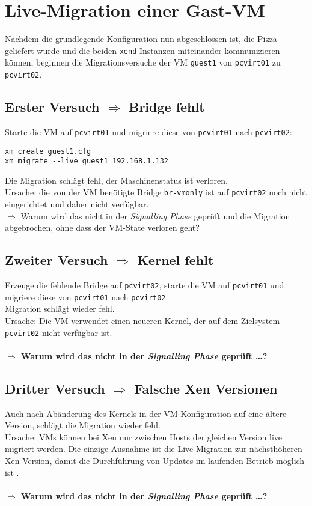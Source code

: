\section{Live-Migration einer Gast-VM}
\label{mig_vers}
Nachdem die grundlegende Konfiguration nun abgeschlossen ist, die Pizza geliefert wurde und die beiden \verb#xend# Instanzen miteinander kommunizieren können, beginnen die Migrationsversuche der VM \verb#guest1# von \verb#pcvirt01# zu \verb#pcvirt02#.

\subsection{Erster Versuch $\Rightarrow$ Bridge fehlt}
Starte die VM auf \verb#pcvirt01# und migriere diese von \verb#pcvirt01# nach \verb#pcvirt02#:
\setupVerbatimOut
\begin{verbatim}
xm create guest1.cfg
xm migrate --live guest1 192.168.1.132
\end{verbatim}

Die Migration schlägt fehl, der Maschinenstatus ist verloren. 
\\
Ursache: die von der VM benötigte Bridge \verb#br-vmonly# ist auf \verb#pcvirt02# noch nicht eingerichtet und daher nicht verfügbar.
\\
$\Rightarrow$ Warum wird das nicht in der \emph{Signalling Phase} geprüft und die Migration abgebrochen, ohne dass der VM-State verloren geht? 

\subsection {Zweiter Versuch $\Rightarrow$ Kernel fehlt}
Erzeuge die fehlende Bridge auf \verb#pcvirt02#, starte die VM auf \verb#pcvirt01# und migriere diese von \verb#pcvirt01# nach \verb#pcvirt02#.
\\
Migration schlägt wieder fehl.\\ 
Ursache: Die VM verwendet einen neueren Kernel, der auf dem Zielsystem \verb#pcvirt02# nicht verfügbar ist.
\\
\\
\large
\textbf{$\Rightarrow$ Warum wird das nicht in der \emph{Signalling Phase} geprüft \dots?}
\normalsize

\subsection {Dritter Versuch $\Rightarrow$ Falsche Xen Versionen}
Auch nach Abänderung des Kernels in der VM-Konfiguration auf eine ältere Version, schlägt die Migration wieder fehl. 
\\
Ursache: VMs können bei Xen nur zwischen Hosts der gleichen Version live migriert werden. Die einzige Ausnahme ist die Live-Migration zur nächsthöheren Xen Version, damit die Durchführung von Updates im laufenden Betrieb möglich ist \cite{wiki_xen_version}.
\\
\\
\Large
\textbf{$\Rightarrow$ Warum wird das nicht in der \emph{Signalling Phase} geprüft \dots?}
\normalsize


